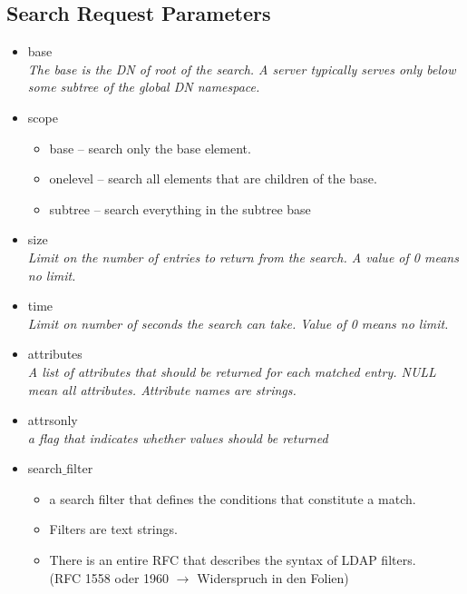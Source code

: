 \documentclass{article} %
\begin{document}
\subsection{Search Request Parameters }
	\begin{itemize}
	\item base\\
		\textit{The base is the DN of root of the search. A server typically serves only below some subtree of the global DN namespace.}
	\item scope 
			\begin{itemize}
			\item base – search only the base element. 
			\item onelevel – search all elements that are children of the base. 
			\item subtree – search everything in the subtree base
			\end{itemize}
	\item size \\
		\textit{Limit on the number of entries to return from the search. A value of 0 means no limit.}
	\item time \\	
		\textit{Limit on number of seconds the search can take. Value of 0 means no limit.}
	\item attributes \\
		\textit{A list of attributes that should be returned for each matched entry. NULL mean all attributes. Attribute names are strings.}
	\item attrsonly \\
		\textit{a flag that indicates whether values should be returned}
	\item search$\_$filter  
			\begin{itemize}
			\item a search filter that defines the conditions that constitute a match. 
			\item Filters are text strings. 
			\item There is an entire RFC that describes the syntax of LDAP filters.\\
			(RFC 1558 oder 1960 $\rightarrow$ Widerspruch in den Folien) 
			\end{itemize}
	\end{itemize}
\end{document}
